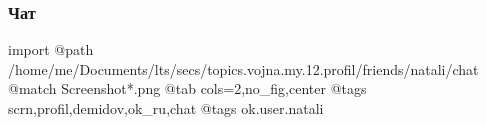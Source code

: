  
 
 
 
 

\subsubsection{Чат}

\ifcmt
 import
 @path /home/me/Documents/lts/secs/topics.vojna.my.12.profil/friends/natali/chat
 @match Screenshot*.png
 @tab cols=2,no_fig,center
 @tags scrn,profil,demidov,ok_ru,chat
 @tags ok.user.natali
\fi
